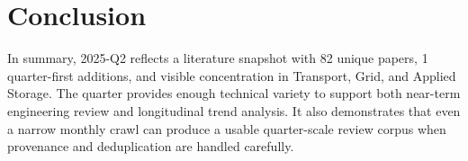 \documentclass[conference]{IEEEtran}
\begin{document}
\section{Conclusion}
In summary, 2025-Q2 reflects a literature snapshot with 82 unique papers, 1 quarter-first additions, and visible concentration in Transport, Grid, and Applied Storage. The quarter provides enough technical variety to support both near-term engineering review and longitudinal trend analysis. It also demonstrates that even a narrow monthly crawl can produce a usable quarter-scale review corpus when provenance and deduplication are handled carefully.



\end{document}
